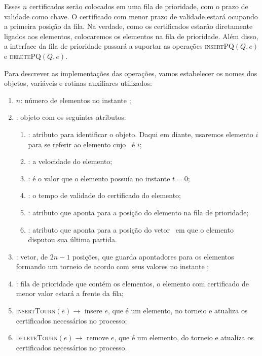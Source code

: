 Esses $n$ certificados serão colocados em uma fila de prioridade,
com o prazo de validade como chave. O certificado com menor prazo de
validade estará ocupando a primeira posição da fila. Na verdade,
como os certificados estarão diretamente ligados aos elementos,
colocaremos os elementos na fila de prioridade. Além disso, a
interface da fila de prioridade passará a suportar as operações
\textsc{insertPQ}$(Q, e)$ e \textsc{deletePQ}$(Q, e)$.

Para descrever as implementações das operações, vamos estabelecer os
nomes dos objetos, variáveis e rotinas auxiliares utilizados:
\begin{enumerate}
    \item $n$: número de elementos no instante \now;
    \item \elemento: objeto com os seguintes atributos:
    \begin{enumerate}
        \item \id: atributo para identificar o objeto.
        Daqui em diante, usaremos elemento $i$ para se referir
        ao elemento cujo \id~é $i$;

        \item \speed: a velocidade do elemento;

        \item \initv: é o valor que o elemento possuía no
        instante $t = 0$;

        \item \cert: o tempo de validade do certificado do
        elemento;

        \item \pqpos: atributo que aponta para a posição do
        elemento na fila de prioridade;

        \item \lastmatch: atributo que aponta para a posição do
        vetor \torneio~em que o elemento disputou sua última
        partida.
    \end{enumerate}
    \item \torneio: vetor, de $2n - 1$ posições, que guarda
    apontadores para os elementos formando um torneio de acordo com
    seus valores no instante \now;

    \item \Q: fila de prioridade que contém os elementos, o elemento
    com certificado de menor valor estará a frente da fila;

    \item \textsc{insertTourn}$(e) \rightarrow$ insere $e$, que é um
    elemento, no torneio e atualiza os certificados necessários no
    processo;

    \item \textsc{deleteTourn}$(e) \rightarrow$ remove $e$, que é um
    elemento, do torneio e atualiza os certificados necessários no
    processo.
\end{enumerate}
